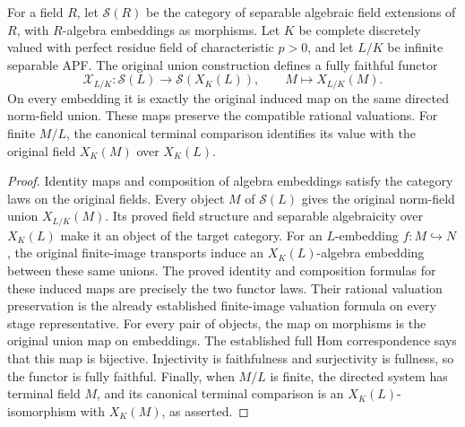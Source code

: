 \begin{lemma}
\label{fw:separable-algebraic-functor}
\leanok
For a field $R$, let $\mathcal S(R)$ be the category of separable
algebraic field extensions of $R$, with $R$-algebra embeddings as
morphisms. Let $K$ be complete discretely valued with perfect residue
field of characteristic $p>0$, and let $L/K$ be infinite separable APF.
The original union construction defines a fully faithful functor
\[
 \mathcal X_{L/K}:\mathcal S(L)\longrightarrow\mathcal S(X_K(L)),
 \qquad M\longmapsto X_{L/K}(M).
\]
On every embedding it is exactly the original induced map on the
same directed norm-field union. These maps preserve the compatible
rational valuations. For finite $M/L$, the canonical terminal comparison
identifies its value with the original field $X_K(M)$ over $X_K(L)$.
\end{lemma}
\begin{proof}
Identity maps and composition of algebra embeddings satisfy the category
laws on the original fields. Every object $M$ of $\mathcal S(L)$ gives
the original norm-field union $X_{L/K}(M)$. Its proved field structure
and separable algebraicity over $X_K(L)$ make it an object of the target
category. For an $L$-embedding $f:M\hookrightarrow N$, the original
finite-image transports induce an $X_K(L)$-algebra embedding between
these same unions. The proved identity and composition formulas for
these induced maps are precisely the two functor laws. Their rational
valuation preservation is the already established finite-image
valuation formula on every stage representative.
For every pair of objects, the map on morphisms is the original union
map on embeddings. The established full Hom correspondence says that
this map is bijective. Injectivity is faithfulness and surjectivity is
fullness, so the functor is fully faithful. Finally, when $M/L$ is finite,
the directed system has terminal field $M$, and its canonical terminal
comparison is an $X_K(L)$-isomorphism with $X_K(M)$, as asserted.
\end{proof}

